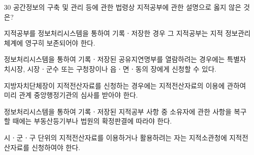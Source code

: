 \begin{question}{30}
공간정보의 구축 및 관리 등에 관한 법령상 지적공부에 관한 설명으로 옳지 않은 것은?
\begin{choices}
  \item 지적공부를 정보처리시스템을 통하여 기록ㆍ저장한 경우 그 지적공부는 지적 정보관리체계에 영구히 보존되어야 한다.
  \item 정보처리시스템을 통하여 기록ㆍ저장된 공유지연명부를 열람하려는 경우에는 특별자치시장, 시장ㆍ군수 또는 구청장이나 읍ㆍ면ㆍ동의 장에게 신청할 수 있다.
  \item 지방자치단체장이 지적전산자료를 신청하는 경우에는 지적전산자료의 이용에 관하여 미리 관계 중앙행정기관의 심사를 받아야 한다.
  \item 정보처리시스템을 통하여 기록ㆍ저장된 지적공부 사항 중 소유자에 관한 사항을 복구할 때에는 부동산등기부나 법원의 확정판결에 따라야 한다.
  \item 시ㆍ군ㆍ구 단위의 지적전산자료를 이용하거나 활용하려는 자는 지적소관청에 지적전산자료를 신청하여야 한다.
\end{choices}
\end{question}

